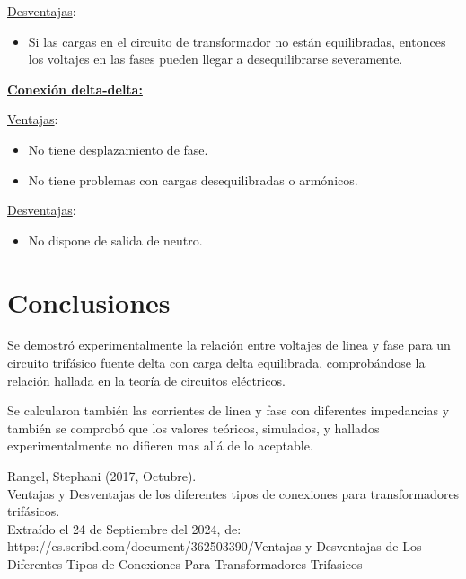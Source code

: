 \documentclass[letter,11pt]{article}
\begin{document}
\begin{enumerate}
\underline{Desventajas}:
\begin{itemize}
    \item Si las cargas en el circuito de transformador no están equilibradas,
        entonces los voltajes en las fases pueden llegar a desequilibrarse
        severamente.
\end{itemize}

\underline{\textbf{Conexión delta-delta:}}

\underline{Ventajas}:
\begin{itemize}
    \item No tiene desplazamiento de fase.
    \item No tiene problemas con cargas desequilibradas o armónicos.
\end{itemize}

\underline{Desventajas}:
\begin{itemize}
    \item No dispone de salida de neutro.
\end{itemize}

\end{enumerate}

\section{Conclusiones}
Se demostró experimentalmente la relación entre voltajes de linea y fase para 
un circuito trifásico fuente delta con carga delta equilibrada, comprobándose la
relación hallada en la teoría de circuitos eléctricos.

Se calcularon también las corrientes de linea y fase con diferentes impedancias
y también se comprobó que los valores teóricos, simulados, y hallados
experimentalmente no difieren mas allá de lo aceptable.

\begin{thebibliography}{99}

 Rangel, Stephani (2017, Octubre).\\
Ventajas y Desventajas de los diferentes tipos de conexiones para transformadores trifásicos.\\
Extraído el 24 de Septiembre del 2024, de:\\
https://es.scribd.com/document/362503390/Ventajas-y-Desventajas-de-Los-Diferentes-Tipos-de-Conexiones-Para-Transformadores-Trifasicos

\end{thebibliography}
\end{document}
